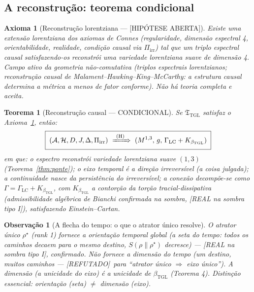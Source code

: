 \documentclass[11pt,a4paper]{article}
\newcommand{\SOMBRA}{\textsf{[REAL na sombra tipo I]}}
\newcommand{\REF}{\textsf{[REFUTADO]}}
\newcommand{\ABERTO}{\textsf{[HIPÓTESE ABERTA]}}
\newcommand{\bTGL}{\beta_{\mathrm{TGL}}}
\newcommand{\Hil}{\mathcal H}
\newcommand{\Alg}{\mathcal A}
\newtheorem{theorem}{Teorema}
\newtheorem{axiom}{Axioma}
\newtheorem{remark}{Observação}
\begin{document}
\subsection{A reconstrução: teorema condicional}
\begin{axiom}[Reconstrução lorentziana --- \ABERTO]\label{ax:lorentz}
Existe uma extensão lorentziana dos axiomas de Connes (regularidade, dimensão
espectral 4, orientabilidade, realidade, condição causal via
$\Pi_{\mathrm{irr}}$) tal que um triplo espectral causal satisfazendo-os
reconstrói uma variedade lorentziana suave de dimensão 4. \emph{Campo ativo
da geometria não-comutativa (triplos espectrais lorentzianos; reconstrução
causal de Malament--Hawking--King--McCarthy: a estrutura causal determina a
métrica a menos de fator conforme). Não há teoria completa e aceita.}
\end{axiom}

\begin{theorem}[Reconstrução causal --- CONDICIONAL]\label{thm:cond}
\emph{Se} $\mathfrak T_{\mathrm{TGL}}$ satisfaz o Axioma~\ref{ax:lorentz},
\emph{então}:
\begin{equation}
\boxed{\;
(\Alg,\Hil,D,J,\Delta,\Pi_{\mathrm{irr}})
\ \xRightarrow{\ \text{(H)}\ }\
(M^{1,3},\,g,\,\Gamma_{\mathrm{LC}}+K_{\bTGL})
\;}
\end{equation}
em que: o espectro reconstrói variedade lorentziana suave $(1,3)$
(Teorema~\ref{thm:ponte}); o eixo temporal é a direção irreversível (a coisa
julgada); a continuidade nasce da persistência do irreversível; a conexão
decompõe-se como $\Gamma=\Gamma_{\mathrm{LC}}+K_{\bTGL}$, com $K_{\bTGL}$ a
contorção da torção tracial-dissipativa (admissibilidade algébrica de Bianchi
confirmada na sombra, \SOMBRA), satisfazendo Einstein--Cartan.
\end{theorem}

\begin{remark}[A flecha do tempo: o que o atrator único resolve]
O atrator único $\rho^\star$ (rank 1) fornece a \emph{orientação} temporal
global (a seta do tempo: todos os caminhos decaem para o mesmo destino,
$S(\rho\|\rho^\star)$ decresce) --- \SOMBRA, confirmado. Não fornece a
\emph{dimensão} do tempo (um destino, muitos caminhos --- \REF\ para
``atrator único $\Rightarrow$ eixo único''). A dimensão (a unicidade do eixo)
é a unicidade de $\bTGL$ (Teorema 4). Distinção essencial: orientação (seta)
$\neq$ dimensão (eixo).
\end{remark}
\end{document}
